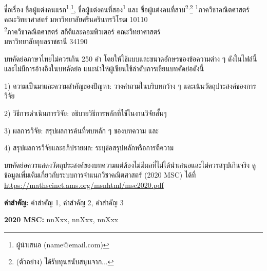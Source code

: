 \documentclass[12pt, a4paper]{article}
\newenvironment{AMM-abstractTH}[4][]{
  \begin{center}
    { \renewcommand\textsuperscript[1]{}\par}
    {{\Large\bfseries #2}\par}
    \medskip
    {\large #3\par}
    \bigskip
    {\small #4\par}
    \bigskip\bigskip
    {{\large\bfseries บทคัดย่อ}\par}
  \end{center}
}{ 
    \bigskip
    \hrule
    \bigskip
}
\newcommand{\mykeywordsTH}[1]{%
    \noindent \textbf{คำสำคัญ:} #1 \par
}
\newcommand{\myMSC}[1]{
    \noindent \textbf{2020 MSC:} #1 \par
}
\begin{document}
%
%

\begin{AMM-abstractTH}[]
{ชื่อเรื่อง} %
{ชื่อผู้แต่งคนแรก\textsuperscript{1,}\footnote{ผู้นำเสนอ (name@email.com)}, ชื่อผู้แต่งคนที่สอง\textsuperscript{1}
และ ชื่อผู้แต่งคนที่สาม\textsuperscript{2,}\footnote{(ตัวอย่าง) ได้รับทุนสนับสนุนจาก...}} %
{\textsuperscript{1}ภาควิชาคณิตศาสตร์ คณะวิทยาศาสตร์
มหาวิทยาลัยศรีนครินทรวิโรฒ 10110\\ \smallskip
\textsuperscript{2}ภาควิชาคณิตศาสตร์ สถิติและคอมพิวเตอร์ คณะวิทยาศาสตร์ \\ มหาวิทยาลัยอุบลราชธานี 34190} %

บทคัดย่อภาษาไทยไม่ควรเกิน 250 คำ 
โดยให้ใช้แบบและขนาดอักษรของข้อความต่าง ๆ ดังในไฟล์นี้ 
และไม่มีการอ้างอิงในบทคัดย่อ แนะนำให้ผู้เขียนใช้ลำดับการเขียนบทคัดย่อดังนี้  

1) ความเป็นมาและความสำคัญของปัญหา: วางคำถามในบริบทกว้าง ๆ และเน้นวัตถุประสงค์ของการวิจัย 

2) วิธีการดำเนินการวิจัย: อธิบายวิธีการหลักที่ใช้ในงานวิจัยสั้นๆ 

3) ผลการวิจัย: สรุปผลการค้นที่พบหลัก ๆ ของบทความ และ 

4) สรุปผลการวิจัยและอภิปรายผล: ระบุข้อสรุปหลักหรือการตีความ 

บทคัดย่อควรแสดงวัตถุประสงค์ของบทความแต่ต้องไม่มีผลที่ไม่ได้นำเสนอและไม่ควรสรุปเกินจริง
ดูข้อมูลเพิ่มเติมเกี่ยวกับระบบการจำแนกวิชาคณิตศาสตร์ (2020 MSC) ได้ที่ \url{https://mathscinet.ams.org/msnhtml/msc2020.pdf}
\end{AMM-abstractTH}


\mykeywordsTH{คำสำคัญ 1, คำสำคัญ 2, คำสำคัญ 3} %
\smallskip
\myMSC{nnXxx, nnXxx, nnXxx} %
\end{document}
